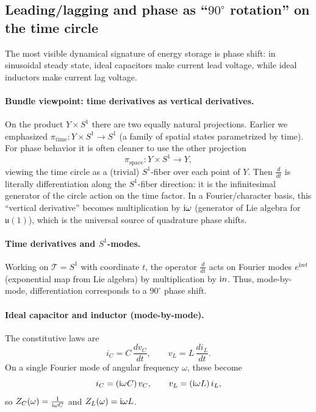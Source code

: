 \documentclass[11pt]{article}
\begin{document}
\subsection{\texorpdfstring{Leading/lagging and phase as ``$90^\circ$ rotation'' on the time circle}{Leading/lagging and phase as ``90-degree rotation'' on the time circle}}
\label{sec:leading-lagging}
The most visible dynamical signature of energy storage is phase shift: in sinusoidal steady state, ideal capacitors make current lead voltage, while ideal inductors make current lag voltage.

\paragraph{Bundle viewpoint: time derivatives as vertical derivatives.}
On the product $Y\times S^1$ there are two equally natural projections.
Earlier we emphasized $\pi_{\mathrm{time}}\colon Y\times S^1\to S^1$ (a family of spatial states parametrized by time).
For phase behavior it is often cleaner to use the other projection
\[
\pi_{\mathrm{space}}\colon Y\times S^1\to Y,
\]
viewing the time circle as a (trivial) $S^1$-fiber over each point of $Y$.
Then $\frac{d}{dt}$ is literally differentiation along the $S^1$-fiber direction: it is the infinitesimal generator of the circle action on the time factor.
In a Fourier/character basis, this ``vertical derivative'' becomes multiplication by $\mathrm{i}\omega$ (generator of Lie algebra for $\mathfrak{u}(1)$), which is the universal source of quadrature phase shifts.

\paragraph{Time derivatives and $S^1$-modes.}
Working on $\mathcal{T}=S^1$ with coordinate $t$, the operator $\frac{d}{dt}$ acts on Fourier modes $e^{\mathrm{i} n t}$ (exponential map from Lie algebra) by multiplication by $\mathrm{i} n$.
Thus, mode-by-mode, differentiation corresponds to a $90^\circ$ phase shift.

\paragraph{Ideal capacitor and inductor (mode-by-mode).}
The constitutive laws are
\[
i_C = C\,\frac{dv_C}{dt},
\qquad
v_L = L\,\frac{di_L}{dt}.
\]
On a single Fourier mode of angular frequency $\omega$, these become
\[
i_C = (\mathrm{i}\omega C)\,v_C,
\qquad
v_L = (\mathrm{i}\omega L)\,i_L,
\]
so $Z_C(\omega)=\frac{1}{\mathrm{i}\omega C}$ and $Z_L(\omega)=\mathrm{i}\omega L$.
\end{document}

